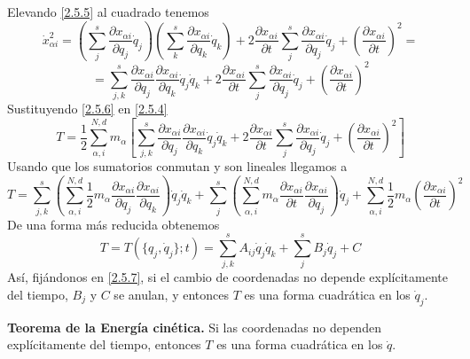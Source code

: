 \vspace{-17pt}
Elevando \eqref{2.5.5} al cuadrado tenemos
\[\dot{x}_{\alpha i}^2= \left(\sum_j^s \frac{\partial x_{\alpha i}}{\partial q_j}\dot{q}_j \right) \left(\sum_k^s \frac{\partial x_{\alpha i}}{\partial q_k}\dot{q}_k \right) + 2\frac{\partial x_{\alpha i}}{\partial t} \sum_j^s \frac{\partial x_{\alpha i}}{\partial q_j}\dot{q}_j  + \left(\frac{\partial x_{\alpha i}}{\partial t}\right)^2 = \]
\begin{equation} \label{2.5.6}
    = \sum_{j,k}^s{\frac{\partial x_{\alpha i}}{\partial q_j}\frac{\partial x_{\alpha i}}{\partial q_k}\dot{q}_j\dot{q}_k} + 2\frac{\partial x_{\alpha i}}{\partial t} \sum_j^s \frac{\partial x_{\alpha i}}{\partial q_j}\dot{q}_j + \left(\frac{\partial x_{\alpha i}}{\partial t}\right)^2
\end{equation} 
Sustituyendo \eqref{2.5.6} en \eqref{2.5.4}
\[ T = \frac{1}{2} \sum_{\alpha, i}^{N,d} m_\alpha \left[\sum_{j,k}^s{\frac{\partial x_{\alpha i}}{\partial q_j}\frac{\partial x_{\alpha i}}{\partial q_k}\dot{q}_j\dot{q}_k} + 2\frac{\partial x_{\alpha i}}{\partial t} \sum_j^s \frac{\partial x_{\alpha i}}{\partial q_j}\dot{q}_j + \left(\frac{\partial x_{\alpha i}}{\partial t}\right)^2\right]\]
Usando que los sumatorios conmutan y son lineales llegamos a
\begin{equation}  
    T = \sum_{j,k}^s{\left(\sum_{\alpha,i}^{N,d} \frac{1}{2} m_\alpha \frac{\partial x_{\alpha i}}{\partial q_j}\frac{\partial x_{\alpha i}}{\partial q_k}\right)\dot{q}_j\dot{q}_k} + \sum_j^s{\left( \sum_{\alpha,i}^{N,d}m_\alpha \frac{\partial x_{\alpha i}}{\partial t}\frac{\partial x_{\alpha i}}{\partial q_j}\right)}\dot{q}_j + \sum_{\alpha,i}^{N,d}{\frac{1}{2} m_\alpha\left(\frac{\partial x_{\alpha i}}{\partial t}\right)^2} \label{2.5.7}
\end{equation} 
De una forma más reducida obtenemos
\begin{equation} \label{2.5.8}
    T = T(\{q_j,\dot{q}_j\};t) = \sum_{j,k}^sA_{ij}\dot{q}_j\dot{q}_k + \sum^s_j B_j \dot{q}_j + C
\end{equation} 
Así, fijándonos en \eqref{2.5.7}, si el cambio de coordenadas no depende explícitamente del tiempo, $B_j$ y $C$ se anulan, y entonces $T$ es una forma cuadrática en los $\dot{q}_j$.

\textbf{Teorema de la Energía cinética.} Si las coordenadas no dependen explícitamente del tiempo, entonces $T$ es una forma cuadrática en los $\dot{q}$.

